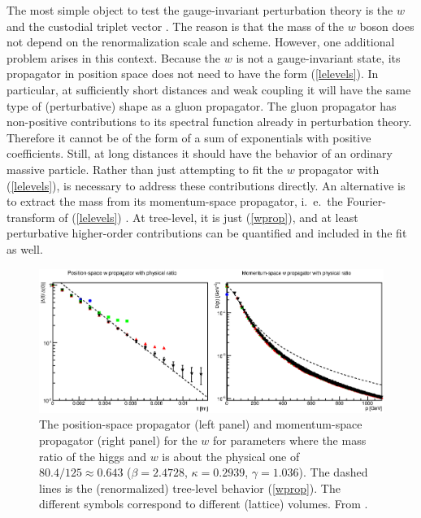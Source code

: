 \documentclass[final,12pt]{article}
\newcommand*{\pref}[1]{(\ref{#1})}
\newcommand*{\1}{1\!\!\!\bot}
\begin{document}
The most simple object to test the gauge-invariant perturbation theory is the $w$ and the custodial triplet vector \cite{Maas:2012tj}. The reason is that the mass of the $w$ boson does not depend on the renormalization scale and scheme. However, one additional problem arises in this context. Because the $w$ is not a gauge-invariant state, its propagator in position space does not need to have the form \pref{lelevels}. In particular, at sufficiently short distances and weak coupling it will have the same type of (perturbative) shape as a gluon propagator. The gluon propagator has  non-positive contributions to its spectral function \cite{Bohm:2001yx} already in perturbation theory. Therefore it cannot be of the form of a sum of exponentials with positive coefficients. Still, at long distances it should have the behavior of an ordinary massive particle. Rather than just attempting to fit the $w$ propagator with \pref{lelevels}, is necessary to address these contributions directly. An alternative is to extract the mass from its momentum-space propagator, i.\ e.\ the Fourier-transform of \pref{lelevels} \cite{Maas:2011se}. At tree-level, it is just \pref{wprop}, and at least perturbative higher-order contributions can be quantified and included in the fit as well.

\begin{figure}
\includegraphics[width=\linewidth]{w}
\caption{\label{fig:w}The position-space propagator (left panel) and momentum-space propagator (right panel) for the $w$ for parameters where the mass ratio of the higgs and $w$ is about the physical one of $80.4/125\approx0.643$ ($\beta=2.4728$, $\kappa=0.2939$, $\gamma=1.036$). The dashed lines is the (renormalized) tree-level behavior \pref{wprop}. The different symbols correspond to different (lattice) volumes. From \cite{Maas:2013aia}.}
\end{figure}
\end{document}
